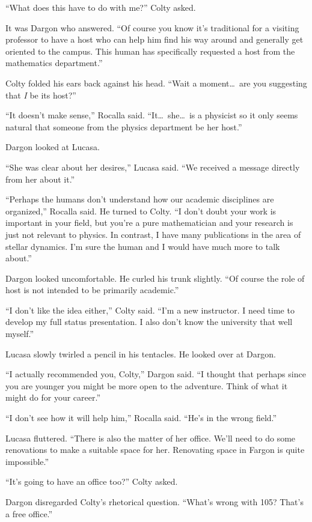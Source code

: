``What does this have to do with me?'' Colty asked.

It was Dargon who answered. ``Of course you know it's traditional for a visiting professor to
have a host who can help him find his way around and generally get oriented to the campus. This
human has specifically requested a host from the mathematics department.''

Colty folded his ears back against his head. ``Wait a moment\ldots\ are you suggesting that
\emph{I} be its host?''

``It doesn't make sense,'' Rocalla said. ``It\ldots\ she\ldots\ is a physicist so it only seems
natural that someone from the physics department be her host.''

Dargon looked at Lucasa.

``She was clear about her desires,'' Lucasa said. ``We received a message directly from her
about it.''

``Perhaps the humans don't understand how our academic disciplines are organized,'' Rocalla
said. He turned to Colty. ``I don't doubt your work is important in your field, but you're a
pure mathematician and your research is just not relevant to physics. In contrast, I have many
publications in the area of stellar dynamics. I'm sure the human and I would have much more to
talk about.''

Dargon looked uncomfortable. He curled his trunk slightly. ``Of course the role of host is not
intended to be primarily academic.''

``I don't like the idea either,'' Colty said. ``I'm a new instructor. I need time to develop my
full status presentation. I also don't know the university that well myself.''

Lucasa slowly twirled a pencil in his tentacles. He looked over at Dargon.

``I actually recommended you, Colty,'' Dargon said. ``I thought that perhaps since you are
younger you might be more open to the adventure. Think of what it might do for your career.''

``I don't see how it will help him,'' Rocalla said. ``He's in the wrong field.''

Lucasa fluttered. ``There is also the matter of her office. We'll need to do some renovations to
make a suitable space for her. Renovating space in Fargon is quite impossible.''

``It's going to have an office too?'' Colty asked.

Dargon disregarded Colty's rhetorical question. ``What's wrong with 105? That's a free office.''

